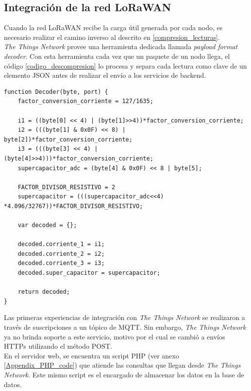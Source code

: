 \subsection{Integraci\'{o}n de la red LoRaWAN}
\label{seccion_lorawan}
Cuando la red LoRaWAN recibe la carga útil generada por cada nodo, es necesario realizar el camino inverso al descrito en \ref{compresion_lecturas}.\\
\textit{The Things Network} provee una herramienta dedicada llamada \textit{payload format decoder}. Con esta herramienta cada vez que un paquete de un nodo llega, el código \ref{codigo_descompresion} lo procesa y separa cada lectura como clave de un elemento JSON antes de realizar el env\'{i}o a los servicios de backend.\\
\begin{lstlisting}[label=codigo_descompresion,caption=Función encargada de descomprimir las 4 lecturas de 12 bits.]
function Decoder(byte, port) {
	factor_conversion_corriente = 127/1635;
	
	i1 = ((byte[0] << 4) | (byte[1]>>4))*factor_conversion_corriente;
	i2 = (((byte[1] & 0x0F) << 8) | byte[2])*factor_conversion_corriente;
	i3 = (((byte[3] << 4) | (byte[4]>>4)))*factor_conversion_corriente;
	supercapacitor_adc = (byte[4] & 0x0F) << 8 | byte[5];
	
	FACTOR_DIVISOR_RESISTIVO = 2
	supercapacitor = (((supercapacitor_adc<<4) *4.096/32767))*FACTOR_DIVISOR_RESISTIVO;	
	
	var decoded = {};
	
	decoded.corriente_1 = i1;
	decoded.corriente_2 = i2;
	decoded.corriente_3 = i3;
	decoded.super_capacitor = supercapacitor;

	return decoded;  
}   

\end{lstlisting}
Las primeras experiencias de integración con \textit{The Things Network} se realizaron a través de suscripciones a un tópico de MQTT. Sin embargo, \textit{The Things Network} ya no brinda soporte a este servicio, motivo por el cual se cambió a envíos HTTPs utilizando el método POST.\\
En el servidor web, se encuentra un script PHP (ver anexo \ref{Appendix_PHP_code}) que atiende las consultas que llegan desde \textit{The Things Network}. Este mismo script es el encargado de almacenar los datos en la base de datos.\\

